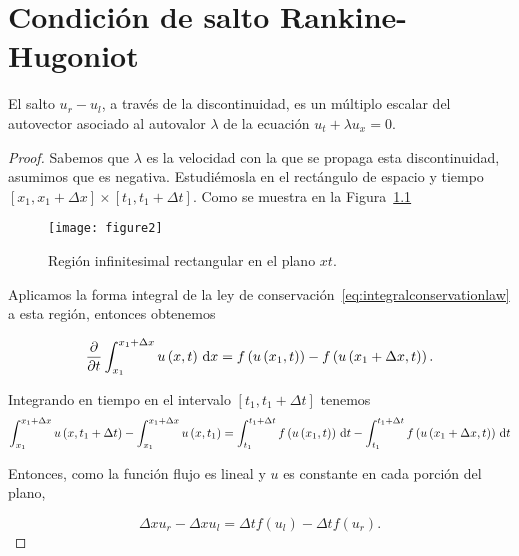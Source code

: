 \chapter{Condición de salto Rankine-Hugoniot}\label{app:rankinehugoniot}

\begin{theorem}
  El salto $u_{r}-u_{l}$, a través de la discontinuidad, es un
  múltiplo escalar del autovector asociado al autovalor $\lambda$ de
  la ecuación $u_{t}+\lambda u_{x}=0$.
\end{theorem}

\begin{proof}
  Sabemos que $\lambda$ es la velocidad con la que se propaga esta
  discontinuidad, asumimos que es negativa.
  Estudiémosla en el rectángulo de espacio y tiempo
  \begin{math}
    \left[x_{1},x_{1}+\Delta x\right]\times
    \left[t_{1},t_{1}+\Delta t\right]
  \end{math}.
  Como se muestra en la Figura~\ref{fig:2}

  \begin{figure}[ht!]
    \centering
    \texttt{[image: figure2]}
    \caption{Región infinitesimal rectangular en el plano $xt$.}
    \label{fig:2}
  \end{figure}

  Aplicamos la forma integral de la ley de
  conservación~\eqref{eq:integralconservationlaw} a esta región,
  entonces obtenemos

  \begin{equation*}
    \diffp{}{t}
    \int_{x_{1}}^{x_{1}+\Delta x}
    u\left(x,t\right)\dl x=
    f\left(u\left(x_{1},t\right)\right)-
    f\left(u\left(x_{1}+\Delta x,t\right)\right).
  \end{equation*}

  Integrando en tiempo en el intervalo
  $\left[t_{1},t_{1}+\Delta t\right]$ tenemos
  \begin{equation*}
    \int_{x_{1}}^{x_{1}+\Delta x}
    u\left(x,t_{1}+\Delta t\right)-
    \int_{x_{1}}^{x_{1}+\Delta x}
    u\left(x,t_{1}\right)=
    \int_{t_{1}}^{t_{1}+\Delta t}
    f\left(u\left(x_{1},t\right)\right)
    \dl t-
    \int_{t_{1}}^{t_{1}+\Delta t}
    f\left(u\left(x_{1}+\Delta x,t\right)\right)
    \dl t
  \end{equation*}

  Entonces, como la función flujo es lineal y $u$ es constante en
  cada porción del plano,

  \begin{equation}\label{eq:difference}
    \Delta x u_{r}-
    \Delta x u_{l}=
    \Delta t f\left(u_{l}\right)-
    \Delta t f\left(u_{r}\right).
  \end{equation}


\end{proof}
